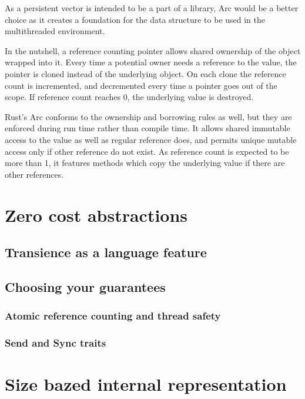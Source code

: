 
As a persistent vector is intended to be a part of a library, Arc would be a better choice as it creates a foundation for the data structure to be used in the multithreaded environment. 


In the nutshell, a reference counting pointer allows shared ownership of the object wrapped into it. Every time a potential owner needs a reference to the value, the pointer is cloned instead of the underlying object. On each clone the reference count is incremented, and decremented every time a pointer goes out of the scope. If reference count reaches 0, the underlying value is destroyed. 

Rust’s Arc conforms to the ownership and borrowing rules as well, but they are enforced during run time rather than compile time. It allows shared immutable access to the value as well as regular reference does, and permits unique mutable access only if other reference do not exist. As reference count is expected to be more than 1, it features methods which copy the underlying value if there are other references. 



\section{Zero cost abstractions}
\subsection{Transience as a language feature}
\subsection{Choosing your guarantees}
\subsubsection{Atomic reference counting and thread safety}
\subsubsection{Send and Sync traits}
\section{Size bazed internal representation}
